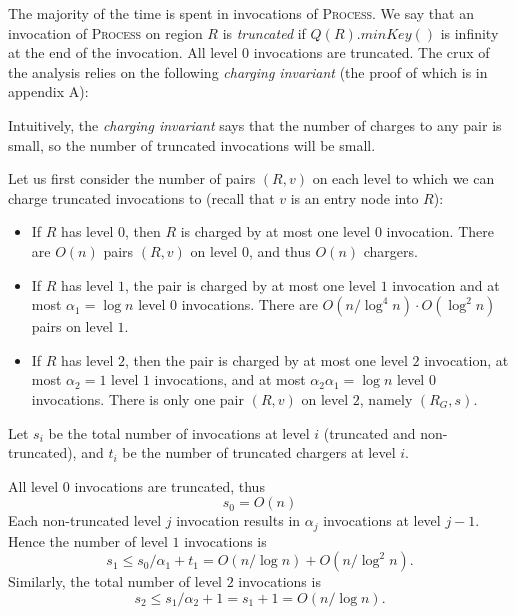 \documentclass[12pt]{article}
\begin{document}
The majority of the time is spent in invocations of \textsc{Process}. We say that an invocation of \textsc{Process} on region $R$ is \emph{truncated} if $Q(R).minKey()$ is infinity at the end of the invocation. All level $0$ invocations are truncated. The crux of the analysis relies on the following \emph{charging invariant} (the proof of which is in appendix A):

\noindent{}

Intuitively, the \emph{charging invariant} says that the number of charges to any pair is small, so the number of truncated invocations will be small.

 Let us first consider the number of pairs $(R,v)$ on each level to which we can charge truncated invocations to (recall that $v$ is an entry node into $R$):
\begin{itemize}
\item If $R$ has level $0$, then $R$ is charged by at most one level $0$ invocation. There are $O(n)$ pairs $(R,v)$ on level $0$, and thus $O(n)$ chargers.
\item If $R$ has level $1$, the pair is charged by at most one level $1$ invocation and at most $\alpha_1 = \log n$ level $0$ invocations. There are $O(n/\log^4n)\cdot O(\log^2 n)$ pairs on level $1$.
\item If $R$ has level $2$, then the pair is charged by at most one level $2$ invocation, at most $\alpha_2 = 1$ level $1$ invocations, and at most $\alpha_2\alpha_1 = \log n$ level $0$ invocations. There is only one pair $(R,v)$ on level $2$, namely $(R_G,s)$.
\end{itemize}

Let $s_i$ be the total number of invocations at level $i$ (truncated and non-truncated), and $t_i$ be the number of truncated chargers at level $i$.

All level $0$ invocations are truncated, thus
\[
s_0 = O(n)
\]
 Each non-truncated level $j$ invocation results in $\alpha_j$ invocations at level $j-1$. Hence the number of level $1$ invocations is
\[
s_1 \leq s_0/\alpha_1 + t_1 = O(n/\log n) + O(n/\log^2 n).
\]
 Similarly, the total number of level $2$ invocations is
\[
s_2 \leq s_1/\alpha_2 + 1 = s_1 + 1 = O(n/\log n).
\]
\end{document}
